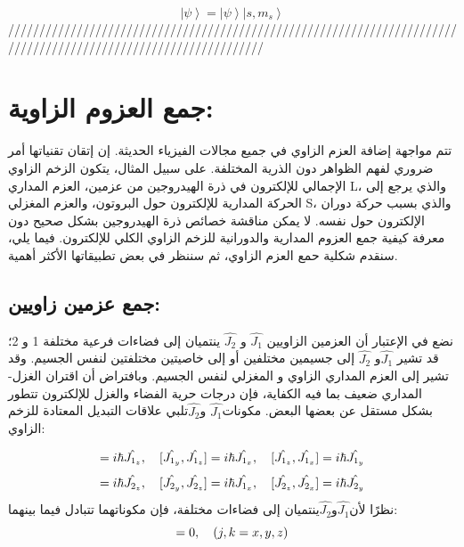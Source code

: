  \begin{equation}
 	 \left|\psi\right\rangle= \left|\psi\right\rangle\left|s, m_s\right\rangle
 \end{equation}
/////////////////////////////////////////////////////////////////////////////////////////////////////////////////

\section{جمع العزوم الزاوية:}
تتم مواجهة إضافة العزم الزاوي في جميع مجالات الفيزياء الحديثة. إن إتقان تقنياتها أمر ضروري لفهم الظواهر دون الذرية المختلفة. على سبيل المثال، يتكون الزخم الزاوي الإجمالي للإلكترون في ذرة الهيدروجين من عزمين، العزم المداري L، والذي يرجع إلى الحركة المدارية للإلكترون حول البروتون، والعزم المغزلي S، والذي بسبب حركة دوران الإلكترون حول نفسه. لا يمكن مناقشة خصائص ذرة الهيدروجين بشكل صحيح دون معرفة كيفية جمع العزوم المدارية والدورانية للزخم الزاوي الكلي للإلكترون. فيما يلي، سنقدم شكلية حمع العزم الزاوي، ثم سننظر في بعض تطبيقاتها الأكثر أهمية.
\subsection{جمع عزمين زاويين:}
نضع في الإعتبار أن العزمين الزاويين
$\hat{J_1}$ و $\hat{J_2}$
		ينتميان إلى فضاءات فرعية مختلفة 1 و 2؛ قد تشير $\hat{J_1}$و $\hat{J_2}$ إلى جسيمين مختلفين أو إلى خاصيتين مختلفتين لنفس الجسيم.
وقد تشير إلى العزم المداري الزاوي و المغزلي لنفس الجسيم. وبافتراض أن اقتران الغزل- المداري ضعيف بما فيه الكفاية، فإن درجات حرية الفضاء والغزل للإلكترون تتطور بشكل مستقل عن بعضها البعض.
مكونات$\hat{J_1}$ و$\hat{J_2}$تلبي علاقات التبديل المعتادة للزخم الزاوي:


\begin{equation}
		[\hat{J_{1_x}}, \hat{J_{1_y}}] =  i\hbar \hat{J_{1_z}},  \\ \quad
	[\hat{J_{1_y}}, \hat{J_{1_z}}]  =  i\hbar \hat{J_{1_x}}, \\ \quad
	[\hat{J_{1_z}}, \hat{J_{1_x}}]  =  i\hbar \hat{J_{1_y}} 
\end{equation}
\begin{equation}
	[\hat{J_{2_x}}, \hat{J_{2_y}}] =  i\hbar \hat{J_{2_z}} , \\ \quad
	[\hat{J_{2_y}}, \hat{J_{2_z}}]  =  i\hbar \hat{J_{1_x}}, \\ \quad
	[\hat{J_{2_z}}, \hat{J_{2_x}}]  =  i\hbar \hat{J_{2_y}} 
\end{equation}
نظرًا لأن$\hat{J_1}$و$\hat{J_2}$ينتميان إلى فضاءات مختلفة، فإن مكوناتهما تتبادل فيما بينهما:
\begin{equation}
		[\hat{J_{1_j}}, \hat{J_{2_k}}] =0,\\ \quad
		(j, k=x,y,z)
\end{equation}

